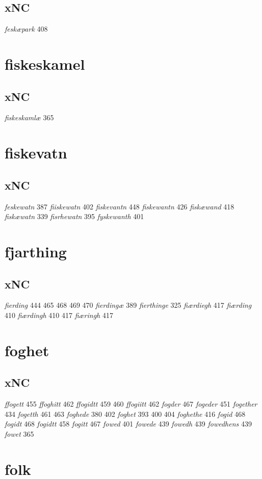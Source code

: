 \documentclass[a4paper,twocolumn]{article}
\begin{document}
\subsection{xNC}
\label{sec:org85a500d}
\emph{feskæpark} 408 
\section{fiskeskamel}
\label{sec:org0461cec}
\subsection{xNC}
\label{sec:orgf3f20ac}
\emph{fiskeskamlæ} 365 
\section{fiskevatn}
\label{sec:org16062bd}
\subsection{xNC}
\label{sec:org80d3fa4}
\emph{feskewatn} 387 \emph{fiiskewatn} 402 \emph{fiskevantn} 448 \emph{fiskewantn} 426 \emph{fiskæwand} 418 \emph{fiskæwatn} 339 \emph{fisrhewatn} 395 \emph{fyskewanth} 401 
\section{fjarthing}
\label{sec:orgf13feea}
\subsection{xNC}
\label{sec:org4da02f3}
\emph{fierding} 444 465 468 469 470 \emph{fierdingæ} 389 \emph{fierthinge} 325 \emph{fiærdiegh} 417 \emph{fiærding} 410 \emph{fiærdingh} 410 417 \emph{fiæringh} 417 
\section{foghet}
\label{sec:orgb530efa}
\subsection{xNC}
\label{sec:orgafe28c7}
\emph{ffogett} 455 \emph{ffoghitt} 462 \emph{ffogidtt} 459 460 \emph{ffogiitt} 462 \emph{fogder} 467 \emph{fogeder} 451 \emph{fogether} 434 \emph{fogetth} 461 463 \emph{foghede} 380 402 \emph{foghet} 393 400 404 \emph{foghethe} 416 \emph{fogid} 468 \emph{fogidt} 468 \emph{fogidtt} 458 \emph{fogitt} 467 \emph{fowed} 401 \emph{fowede} 439 \emph{fowedh} 439 \emph{fowedhens} 439 \emph{fowet} 365 
\section{folk}
\label{sec:org33ad9c5}
\end{document}
